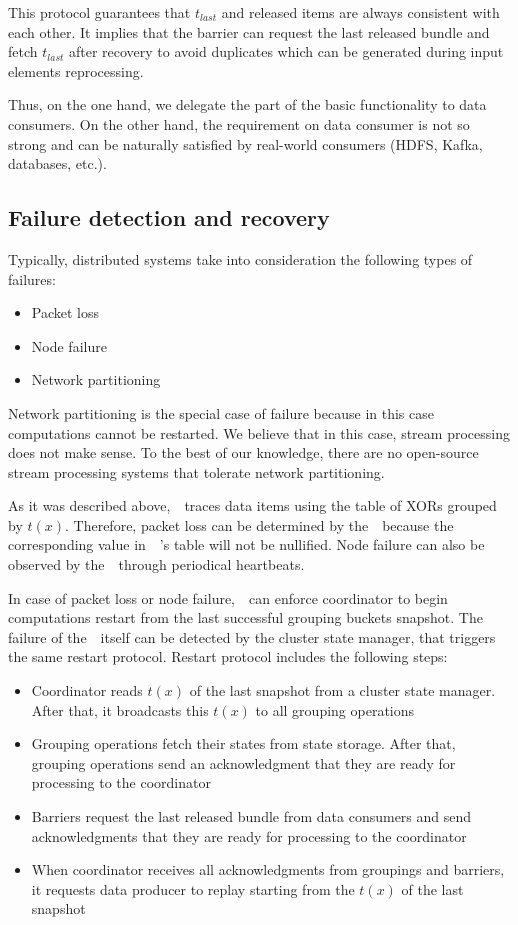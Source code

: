 This protocol guarantees that $t_{last}$ and released items are always consistent with each other. It implies that the barrier can request the last released bundle and fetch $t_{last}$ after recovery to avoid duplicates which can be generated during input elements reprocessing.

Thus, on the one hand, we delegate the part of the basic functionality to data consumers. On the other hand, the requirement on data consumer is not so strong and can be naturally satisfied by real-world consumers (HDFS, Kafka, databases, etc.). 

\subsection{Failure detection and recovery}

Typically, distributed systems take into consideration the following types of failures:
\begin{itemize}
    \item Packet loss
    \item Node failure
    \item Network partitioning
\end{itemize}

Network partitioning is the special case of failure because in this case computations cannot be restarted. We believe that in this case, stream processing does not make sense. To the best of our knowledge, there are no open-source stream processing systems that tolerate network partitioning.

As it was described above,~\Acker\ traces data items using the table of XORs grouped by $t(x)$. Therefore, packet loss can be determined by the~\Acker\ because the corresponding value in~\Acker\ 's table will not be nullified. Node failure can also be observed by the~\Acker\ through periodical heartbeats. 

In case of packet loss or node failure,~\Acker\ can enforce coordinator to begin computations restart from the last successful grouping buckets snapshot. The failure of the~\Acker\ itself can be detected by the cluster state manager, that triggers the same restart protocol. Restart protocol includes the following steps:

\begin{itemize}
    \item Coordinator reads $t(x)$ of the last snapshot from a cluster state manager. After that, it broadcasts this $t(x)$ to all grouping operations
    \item Grouping operations fetch their states from state storage. After that, grouping operations send an acknowledgment that they are ready for processing to the coordinator 
    \item Barriers request the last released bundle from data consumers and send acknowledgments that they are ready for processing to the coordinator
    \item When coordinator receives all acknowledgments from groupings and barriers, it requests data producer to replay starting from the $t(x)$ of the last snapshot  
\end{itemize}

